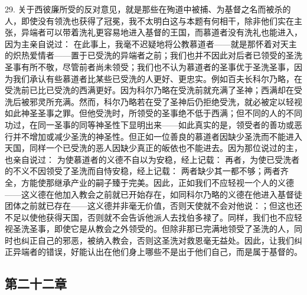 29. 关于西彼廉所受的反对意见，就是那些在殉道中被捕、为基督之名而被杀的人，即使没有领洗也获得了冠冕，我不太明白这与本题有何相干，除非他们实在主张，异端者可以带着洗礼更容易地进入基督的王国，而慕道者没有洗礼也能进入，因为主亲自说过： 在此事上，我毫不迟疑地将公教慕道者——就是那怀着对天主的炽热爱情者——置于已受洗的异端者之前；我们也并不因此对后者已领受的圣洗圣事有所不敬，尽管前者尚未领受；我们也不认为慕道者的圣事优于圣洗圣事，因为我们承认有些慕道者比某些已受洗的人更好、更忠实。例如百夫长科尔乃略，在受洗前已比已受洗的西满更好。因为科尔乃略在受洗前就充满了圣神；西满却在受洗后被邪灵所充满。然而，科尔乃略若在受了圣神后仍拒绝受洗，就必被定以轻视如此神圣圣事之罪。但他受洗时，所领受的圣事绝不低于西满；但不同的人的不同功过，在同一圣事的同等神圣性下显明出来——如此真实的是，领受者的善功或恶行并不增加或减少圣洗的神圣性。但正如一位善良的慕道者因缺少圣洗而不能进入天国，同样一个已受洗的恶人因缺少真正的皈依也不能进去。因为那位说过的主，也亲自说过： 为使慕道者的义德不自以为安稳，经上记载： 再者，为使已受洗者的不义不因领受了圣洗而自恃安稳，经上记载： 两者缺少其一都不够；两者齐全，方能使那继承产业的嗣子臻于完美。因此，正如我们不应轻视一个人的义德——这义德在他加入教会之前就已开始存在，如同科尔乃略的义德在他进入基督徒团体之前就已存在——这义德并非毫无价值，否则天使就不会对他说：；但这也还不足以使他获得天国，否则就不会告诉他派人去找伯多禄了。同样，我们也不应轻视圣洗圣事，即使它是从教会之外领受的。但除非那已完满地领受了圣洗的人，同时也纠正自己的邪恶，被纳入教会，否则这圣洗对救恩毫无益处。因此，让我们纠正异端者的错误，好能认出在他们身上哪些不是出于他们自己，而是属于基督的。\par


\subsection{第二十二章}

